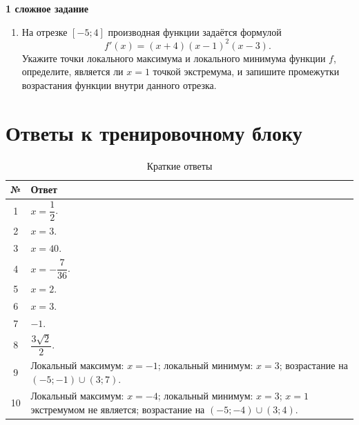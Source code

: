 \documentclass[a4paper,12pt]{article}
\begin{document}
\textbf{1 сложное задание}
\begin{enumerate}[label=\textbf{\arabic*.},start=10]
  \item На отрезке $[-5;4]$ производная функции задаётся формулой
  \[
  f'(x)=(x+4)(x-1)^2(x-3).
  \]
  Укажите точки локального максимума и локального минимума функции $f$, определите, является ли $x=1$ точкой экстремума, и запишите промежутки возрастания функции внутри данного отрезка.
\end{enumerate}

\clearpage
\section{Ответы к тренировочному блоку}

\renewcommand{\arraystretch}{1.35}
\begin{table}[ht]
\centering
\caption{Краткие ответы}
\begin{tabularx}{\linewidth}{@{}cX@{}}
\toprule
\textbf{№} & \textbf{Ответ} \\
\midrule
1 & $x=\dfrac12$. \\
2 & $x=3$. \\
3 & $x=40$. \\
4 & $x=-\dfrac{7}{36}$. \\
5 & $x=2$. \\
6 & $x=3$. \\
7 & $-1$. \\
8 & $\dfrac{3\sqrt2}{2}$. \\
9 & Локальный максимум: $x=-1$; локальный минимум: $x=3$; возрастание на $(-5;-1)\cup(3;7)$. \\
10 & Локальный максимум: $x=-4$; локальный минимум: $x=3$; $x=1$ экстремумом не является; возрастание на $(-5;-4)\cup(3;4)$. \\
\bottomrule
\end{tabularx}
\end{table}
\end{document}
